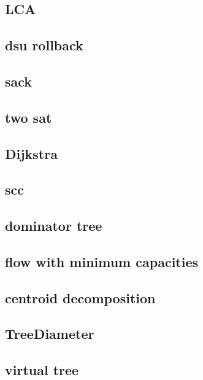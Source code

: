 \subsection{LCA}
\raggedbottom
\hrulefill
\subsection{dsu rollback}
\raggedbottom
\hrulefill
\subsection{sack}
\raggedbottom
\hrulefill
\subsection{two sat}
\raggedbottom
\hrulefill
\subsection{Dijkstra}
\raggedbottom
\hrulefill
\subsection{scc}
\raggedbottom
\hrulefill
\subsection{dominator tree}
\raggedbottom
\hrulefill
\subsection{flow with minimum capacities}
\raggedbottom
\hrulefill
\subsection{centroid decomposition}
\raggedbottom
\hrulefill
\subsection{TreeDiameter}
\raggedbottom
\hrulefill
\subsection{virtual tree}
\raggedbottom
\hrulefill
